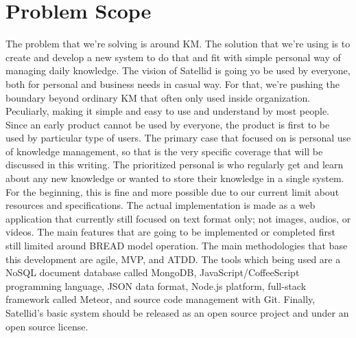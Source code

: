 \section{Problem Scope}
\label{sec:problem-scope}

The problem that we're solving is around \ac{KM}.
The solution that we're using is to create and develop a new system to do that and fit with simple personal way of managing daily knowledge.
The vision of Satellid is going yo be used by everyone, both for personal and business needs in casual way.
For that, we're pushing the boundary beyond ordinary \ac{KM} that often only used inside organization.
Peculiarly, making it simple and easy to use and understand by most people.
Since an early product cannot be used by everyone, the product is first to be used by particular type of users.
The primary case that focused on is personal use of knowledge management, so that is the very specific coverage that will be discussed in this writing.
The prioritized personal is who regularly get and learn about any new knowledge or wanted to store their knowledge in a single system.
For the beginning, this is fine and more possible due to our current limit about resources and specifications.
The actual implementation is made as a web application that currently still focused on text format only; not images, audios, or videos.
The main features that are going to be implemented or completed first still limited around \ac{BREAD} model operation.
The main methodologies that base this development are agile, \ac{MVP}, and \ac{ATDD}.
The tools which being used are a NoSQL document database called MongoDB, JavaScript/CoffeeScript programming language, JSON data format, Node.js platform, full-stack framework called Meteor, and source code management with Git.
Finally, Satellid's basic system should be released as an open source project and under an open source license.
